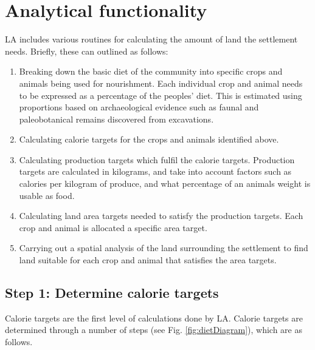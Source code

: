 \section{Analytical functionality} \label{sec:Analytical Functionality}

LA includes various routines for calculating the amount of land 
the settlement needs.  Briefly, these can outlined as follows:

  \begin{enumerate} 
  \item Breaking down the basic diet of the community into specific crops and
  animals being used for nourishment.  Each individual crop and animal needs to
  be expressed as a percentage of the peoples' diet.  This is estimated using
  proportions based on archaeological evidence such as faunal and
  paleobotanical remains discovered from excavations.  
  \item Calculating  calorie targets for the crops and animals identified above.
 
  \item Calculating production targets which fulfil the calorie targets.
  Production targets are calculated in kilograms, and take into account factors
such as 
  calories per kilogram of produce, and what percentage of an animals weight is
  usable as food.  
  \item Calculating land area targets needed to satisfy the
  production targets.  Each crop and animal is allocated a specific area
  target.  
  \item Carrying out a spatial analysis of the land surrounding the settlement
to
  find land suitable for each crop and animal that satisfies the area targets.  
  \end{enumerate}

\subsection{Step 1: Determine calorie targets}
  Calorie targets are the first level of calculations done by LA.  Calorie
targets are determined 
through a number of steps (see Fig. \ref{fig:dietDiagram}), which are as
follows.


